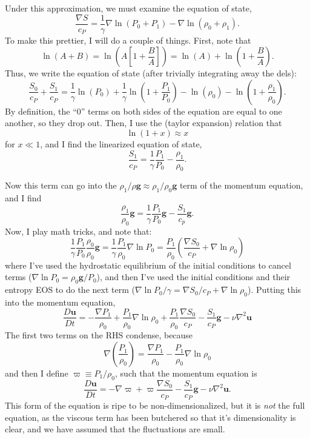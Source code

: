 \documentclass[aps, pre, onecolumn, nofootinbib, notitlepage, groupedaddress, amsfonts, amssymb, amsmath, longbibliography]{revtex4-1}
\newcommand{\grad}{\ensuremath{\nabla}}
\begin{document}
Under this approximation, we must examine the equation of state,
\begin{equation}
\frac{\grad S}{c_P} = \frac{1}{\gamma}\grad\ln(P_0 + P_1) - \grad \ln (\rho_0 + \rho_1).
\end{equation}
To make this prettier, I will do a couple of things.  First, note that
$$
\ln (A + B) = \ln\left(A\left[1 + \frac{B}{A}\right]\right) = \ln(A) + \ln\left(1 + \frac{B}{A}\right).
$$
Thus, we write the equation of state (after trivially integrating away the dels):
\begin{equation}
\frac{S_0}{c_P} + \frac{S_1}{c_P} = \frac{1}{\gamma}\ln(P_0) + \frac{1}{\gamma}\ln\left(1 + \frac{P_1}{P_0}\right)
- \ln(\rho_0) - \ln\left(1 + \frac{\rho_1}{\rho_0}\right).
\end{equation}
By definition, the ``0'' terms on both sides of the equation are equal to one another, so they
drop out.  Then, I use the (taylor expansion) relation that
$$
\ln(1 + x) \approx x
$$
for $x \ll 1$, and I find the linearized equation of state,
\begin{equation}
\boxed{
\frac{S_1}{c_P} = \frac{1}{\gamma} \frac{P_1}{P_0} - \frac{\rho_1}{\rho_0}
}.
\end{equation}

Now this term can go into the $\rho_1/\rho \bm{g} \approx \rho_1/\rho_0 \bm{g}$ term 
of the momentum equation, and I find
$$
\frac{\rho_1}{\rho_0}\bm{g} = \frac{1}{\gamma}\frac{P_1}{P_0}\bm{g} - \frac{S_1}{c_p}\bm{g}.
$$
Now, I play math tricks, and note that:
$$
\frac{1}{\gamma}\frac{P_1}{P_0}\frac{\rho_0}{\rho_0}\bm{g} = \frac{1}{\gamma}\frac{P_1}{\rho_0}\grad\ln P_0
= \frac{P_1}{\rho_0}\left(\frac{\grad S_0}{c_P} + \grad \ln \rho_0\right)
$$
where I've used the hydrostatic equilibrium of the initial conditions to cancel terms 
($\grad \ln P_0 = \rho_0 \bm{g} / P_0$), and then I've used the initial conditions
and their entropy EOS to do the next term ($\grad \ln P_0 / \gamma = \grad S_0 / c_P + \grad \ln \rho_0$).
Putting this into the momentum equation,
\begin{equation}
\frac{D\bm{u}}{Dt} = -\frac{\grad P_1}{\rho_0} + \frac{P_1}{\rho_0}\grad\ln\rho_0 + \frac{P_1}{\rho_0}\frac{\grad S_0}{c_P}
- \frac{S_1}{c_P}\bm{g} - \nu \grad^2\bm{u}
\end{equation}
The first two terms on the RHS condense, because
$$
\grad\left(\frac{P_1}{\rho_0}\right) = \frac{\grad P_1}{\rho_0} - \frac{P_1}{\rho_0}\grad\ln\rho_0
$$
and then I define $\varpi \equiv P_1/\rho_0$, such that the momentum equation is
\begin{equation}
\boxed{
\frac{D\bm{u}}{Dt} = -\grad \varpi + \varpi \frac{\grad S_0}{c_P} - \frac{S_1}{c_P}\bm{g} - \nu\grad^2\bm{u}.
}
\end{equation}
This form of the equation is ripe to be non-dimensionalized, but it is \emph{not} the full equation,
as the viscous term has been butchered so that it's dimensionality is clear, and we have assumed that
the fluctuations are small.



\end{document}
